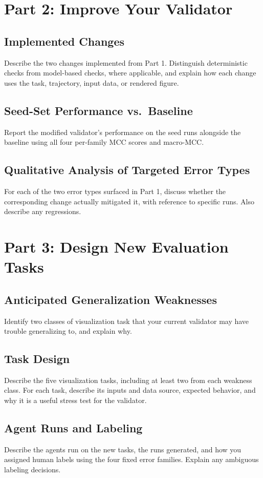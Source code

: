 \documentclass[11pt]{article}
\begin{document}
\section{Part 2: Improve Your Validator}

\subsection{Implemented Changes}
Describe the two changes implemented from Part 1. Distinguish deterministic
checks from model-based checks, where applicable, and explain how each change
uses the task, trajectory, input data, or rendered figure.

\subsection{Seed-Set Performance vs.\ Baseline}
Report the modified validator's performance on the seed runs alongside the
baseline using all four per-family MCC scores and macro-MCC.

\subsection{Qualitative Analysis of Targeted Error Types}
For each of the two error types surfaced in Part 1, discuss whether the
corresponding change actually mitigated it, with reference to specific runs.
Also describe any regressions.

\section{Part 3: Design New Evaluation Tasks}

\subsection{Anticipated Generalization Weaknesses}
Identify two classes of visualization task that your current validator may
have trouble generalizing to, and explain why.

\subsection{Task Design}
Describe the five visualization tasks, including at least two from each
weakness class. For each task, describe its inputs and data source, expected
behavior, and why it is a useful stress test for the validator.

\subsection{Agent Runs and Labeling}
Describe the agents run on the new tasks, the runs generated, and how you
assigned human labels using the four fixed error families. Explain any
ambiguous labeling decisions.
\end{document}
